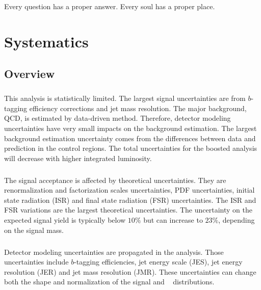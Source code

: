 \begin{savequote}[75mm]
Every question has a proper answer. Every soul has a proper place.
\end{savequote}

\chapter{Systematics}
\label{sec:systematics}


\section{Overview}
\label{sec:systematics-overview}
\paragraph{}
This analysis is statistically limited.
The largest signal uncertainties are from $b$-tagging efficiency corrections and jet mass resolution.
The major background, QCD, is estimated by data-driven method. 
Therefore, detector modeling uncertainties have very small impacts on the background estimation.
The largest background estimation uncertainty comes from the differences between data and prediction in the control regions.
The total uncertainties for the boosted analysis will decrease with higher integrated luminosity.

\paragraph{}
The signal acceptance is affected by theoretical uncertainties.
They are renormalization and factorization scales uncertainties, PDF uncertainties, initial state radiation (ISR) and final state radiation (FSR) uncertainties.
The ISR and FSR variations are the largest theoretical uncertainties.
The uncertainty on the expected signal yield is typically below $10\%$ but can increase to $23\%$, depending on the signal mass.

\paragraph{}
Detector modeling uncertainties are propagated in the analysis.
Those uncertainties include $b$-tagging efficiencies, jet energy scale (JES), jet energy resolution (JER) and jet mass resolution (JMR).
These uncertainties can change both the shape and normalization of the signal and \ttbar~ distributions.

